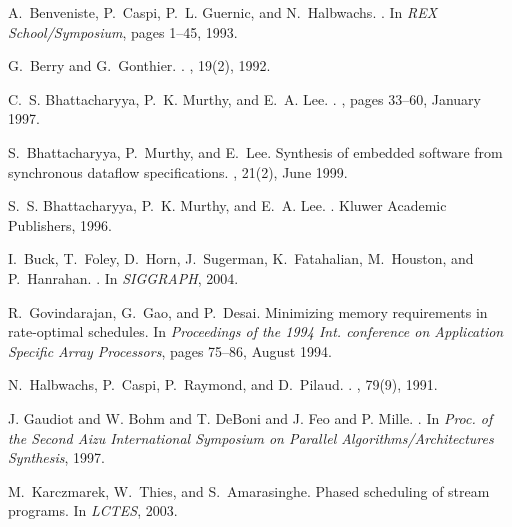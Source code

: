 \documentclass{sigplanconf}
\begin{document}
\begin{thebibliography}{10}

A.~Benveniste, P.~Caspi, P.~L. Guernic, and N.~Halbwachs.
.
\newblock In {\em {REX} School/Symposium}, pages 1--45, 1993.

G.~Berry and G.~Gonthier.
.
, 19(2), 1992.

C.~S. Bhattacharyya, P.~K. Murthy, and E.~A. Lee.
.
, pages
  33--60, January 1997.

S.~Bhattacharyya, P.~Murthy, and E.~Lee.
\newblock Synthesis of embedded software from synchronous dataflow
  specifications.
, 21(2), June 1999.

S.~S. Bhattacharyya, P.~K. Murthy, and E.~A. Lee.
.
\newblock Kluwer Academic Publishers, 1996.

I.~Buck, T.~Foley, D.~Horn, J.~Sugerman, K.~Fatahalian, M.~Houston, and
  P.~Hanrahan.
.
\newblock In {\em SIGGRAPH}, 2004.

R.~Govindarajan, G.~Gao, and P.~Desai.
\newblock Minimizing memory requirements in rate-optimal schedules.
\newblock In {\em Proceedings of the 1994 Int. conference on Application
  Specific Array Processors}, pages 75--86, August 1994.

N.~Halbwachs, P.~Caspi, P.~Raymond, and D.~Pilaud.
.
, 79(9), 1991.

{J. Gaudiot and W. Bohm and T. DeBoni and J. Feo and P. Mille}.
.
\newblock In {\em Proc. of the Second Aizu International Symposium on Parallel
  Algorithms/Architectures Synthesis}, 1997.

M.~Karczmarek, W.~Thies, and S.~Amarasinghe.
\newblock Phased scheduling of stream programs.
\newblock In {\em LCTES}, 2003.


\end{thebibliography}
\end{document}

